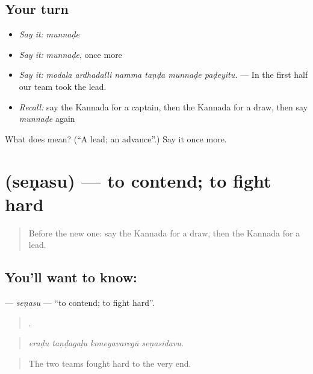 \subsection*{Your turn}
\begin{itemize}
\raggedright
  \item \emph{Say it:} \emph{munnaḍe}
  \item \emph{Say it:} \emph{munnaḍe}, once more
  \item \emph{Say it:} \emph{modala ardhadalli namma taṇḍa munnaḍe paḍeyitu.} — In the first half our team took the lead.
  \item \emph{Recall:} say the Kannada for a captain, then the Kannada for a draw, then say \emph{munnaḍe} again
\end{itemize}

\begin{tcolorbox}[breakable,colback=teal!4,colframe=teal!35!black,title={Before you move on}]
What does  mean? (\textquotedblleft{}A lead; an advance\textquotedblright{}.) Say it once more.
\end{tcolorbox}
\section[\texorpdfstring{\kn{ಸೆಣಸು} (seṇasu)}{ಸೆಣಸು (seṇasu)}]{ (seṇasu) — to contend; to fight hard}

\label{lesson:KA-C539-senasu}



\begin{quote}
Before the new one: say the Kannada for a draw, then the Kannada for a lead.
\end{quote}

\subsection*{You'll want to know: }
\textbf{} — \emph{seṇasu} — \textquotedblleft{}to contend; to fight hard\textquotedblright{}.

\begin{quote}
   .
\end{quote}

\begin{quote}
\emph{eraḍu taṇḍagaḷu koneyavaregū seṇasidavu.}
\end{quote}

\begin{quote}
The two teams fought hard to the very end.
\end{quote}


